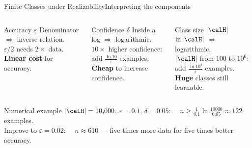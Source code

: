 \begin{frame}{Finite Classes under Realizability}{Interpreting the components}
  \begin{columns}[T]
    \begin{block}{Accuracy $\varepsilon$}
      Denominator $\Rightarrow$ inverse relation.\\[4pt]
      $\varepsilon/2$ needs $2\times$ data.\\[4pt]
      \textbf{Linear cost} for accuracy.
    \end{block}
    \begin{block}{Confidence $\delta$}
      Inside a log $\Rightarrow$ logarithmic.\\[4pt]
      $10\times$ higher confidence: add $\frac{\ln 10}{\varepsilon}$ examples.\\[4pt]
      \textbf{Cheap} to increase confidence.
    \end{block}
    \begin{block}{Class size $|\calH|$}
      $\ln|\calH|$ $\Rightarrow$ logarithmic.\\[4pt]
      $|\calH|$ from $100$ to $10^6$: add $\frac{\ln10^4}{\varepsilon}$ examples.\\[4pt]
      \textbf{Huge} classes still learnable.
    \end{block}
  \end{columns}
  \bigskip
  \begin{exampleblock}{Numerical example}
    $|\calH|=10{,}000$,\; $\varepsilon=0.1$,\; $\delta=0.05$:
    $\quad n \geq \tfrac{1}{0.1}\ln\!\tfrac{10000}{0.05} \approx 122$ examples.\\
    Improve to $\varepsilon=0.02$:
    $\quad n \approx 610$ — five times more data for five times better accuracy.
  \end{exampleblock}
\end{frame}

